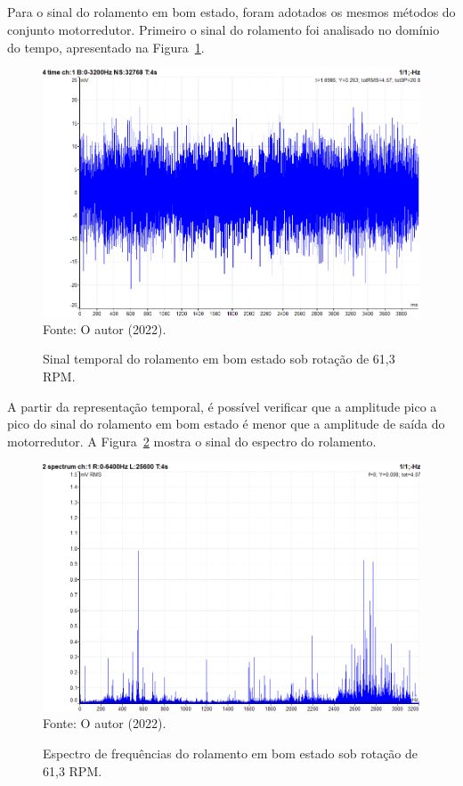 \documentclass[
	12pt,				
	oneside,			
	a4paper,			
	english,			
	brazil,			
	]{abntex2ppgsi}
\begin{document}
\subsection{}

Para o sinal do rolamento em bom estado, foram adotados os mesmos métodos do conjunto motorredutor. Primeiro o sinal do rolamento foi analisado no domínio do tempo, apresentado na Figura~\ref{ROLAMENTO_BOM_ESTADO_TEMPO}.

\begin{figure}[H]
\centering
\caption {Sinal temporal do rolamento em bom estado sob rotação de 61,3 RPM.}
\includegraphics[width=\textwidth,keepaspectratio]{ROLAMENTO_BOM_ESTADO_TEMPO} \\
Fonte: O autor (2022).
\label{ROLAMENTO_BOM_ESTADO_TEMPO}
\end{figure}

A partir da representação temporal, é possível verificar que a amplitude pico a pico do sinal do rolamento em bom estado é menor que a amplitude de saída do motorredutor. A Figura~\ref{ROLAMENTO_BOM_ESTADO_ESPECTRO} mostra o sinal do espectro do rolamento. 

\begin{figure}[H]
\centering
\caption {Espectro de frequências do rolamento em bom estado sob rotação de 61,3 RPM.}
\includegraphics[width=\textwidth,keepaspectratio]{espectro_rolamento_bom_mc6v_mv} \\
Fonte: O autor (2022).
\label{ROLAMENTO_BOM_ESTADO_ESPECTRO}
\end{figure}
\end{document}
